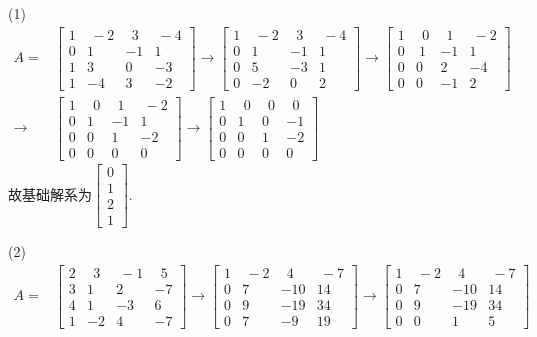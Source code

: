 \documentclass[a4paper]{book}
\begin{document}
(1)\begin{displaymath}
\begin{aligned}
A=&\begin{bmatrix}1&\ -2&\ \ 3&\ -4\\0&1&-1&1\\1&3&0&-3\\1&-4&3&-2   \end{bmatrix}\rightarrow
\begin{bmatrix} 1&\ -2&\ \ 3&\ -4\\0&1&-1&1\\0&5&-3&1\\0&-2&0&2  \end{bmatrix}\rightarrow
\begin{bmatrix}1&\ \ 0&\ \ 1&\ -2\\0&\  1&-1&1\\0&0&2&-4\\0&0&-1&2   \end{bmatrix}\\ \rightarrow &
\begin{bmatrix}1&\ \ 0&\ \ 1&\ -2\\0&1&-1&1\\0&0&1&-2\\0&0&0&0   \end{bmatrix}\rightarrow
\begin{bmatrix}1&\ \ 0&\ \ 0&\ \ 0\\0&1&0&-1\\0&0&1&-2\\0&0&0&0   \end{bmatrix} \end{aligned} \end{displaymath}
故基础解系为$\begin{bmatrix}0\\1\\2\\1\end{bmatrix}$.

(2)
\begin{displaymath}
\begin{aligned}
A=&\begin{bmatrix}2&\ \ 3&\ -1&\ \ 5\\3&1&2&-7\\4&1&-3&6\\1&-2&4&-7   \end{bmatrix}\rightarrow
\begin{bmatrix}1&\ -2&\ \ 4&\ -7\\0&7&-10&14\\0&9&-19&34\\0&7&-9&19    \end{bmatrix}\rightarrow
\begin{bmatrix}1&\ -2&\ \ 4&\ -7\\0&7&-10&14\\0&9&-19&34\\0&0&1&5    \end{bmatrix}\end{aligned} \end{displaymath}
\end{document}

